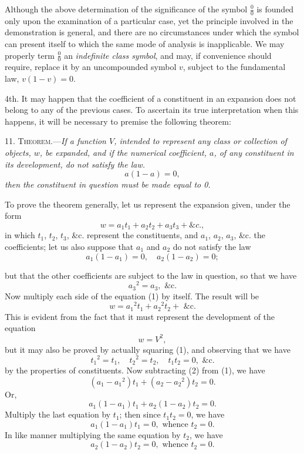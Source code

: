 \documentclass[oneside]{book}
\begin{document}
Although the above determination of the significance of the
symbol $\frac{0}{0}$ is founded only upon the examination of a particular
case, yet the principle involved in the demonstration is general,
and there are no circumstances under which the symbol can present
itself to which the same mode of analysis is inapplicable.
We may properly term $\frac{0}{0}$ an \textit{indefinite class symbol}, and may, if
convenience should require, replace it by an uncompounded symbol
$v$, subject to the fundamental law, $v (1 - v) = 0$.

4th. It may happen that the coefficient of a constituent in an
expansion does not belong to any of the previous cases. To ascertain
its true interpretation when this happens, it will be necessary
to premise the following theorem:

11. \textsc{Theorem.}---\textit{If a function $V$, intended to represent any
class or collection of objects, $w$, be expanded, and if the numerical
coefficient, $a$, of any constituent in its development, do not satisfy
the law.
\[
a\left(1-a\right) = 0,
\]
then the constituent in question must be made equal to 0.}

To prove the theorem generally, let us represent the expansion
given, under the form
\setcounter{equation}{0}
\begin{equation}
w = a_1 t_1 + a_2 t_2  + a_3 t_3 + \&c.,
\end{equation}
in which $t_1$, $t_2$, $t_3$, \&c. represent the constituents, and $a_1$, $a_2$, $a_3$, \&c.
the coefficients; let us also suppose that $a_1$ and $a_2$ do not satisfy
the law
\[
a_1 \left(1 - a_1\right) = 0, \quad a_2 \left(1 - a_2\right) = 0;
\]

but that the other coefficients are subject to the law in question,
so that we have
\[
{a_3}^2 = a_3, \textrm{ \&c.}
\]
Now multiply each side of the equation (1) by itself. The result
will be
\begin{equation}
w = {a_1}^2 t_1 + {a_2}^2 t_2 + \textrm{ \&c.}
\end{equation}
This is evident from the fact that it must represent the development
of the equation
\[
w = V^2,
\]
but it may also be proved by actually squaring (1), and observing
that we have
\[
{t_1}^2 = t_1, \quad {t_2}^2 = t_2, \quad t_1 t_2 = 0, \textrm{ \&c.}
\]
by the properties of constituents. Now subtracting (2) from (1),
we have
\[
\left(a_1 - {a_1}^2\right) t_1 + \left(a_2 - {a_2}^2\right) t_2 = 0.
\]
Or,
\[
a_1\left(1 - a_1\right) t_1 + a_2 \left(1 - a_2\right) t_2 = 0.
\]
Multiply the last equation by $t_1$; then since $t_1 t_2 = 0$, we have
\[
a_1 \left(1 - a_1\right) t_1 = 0,\textrm{ whence } t_2 = 0.
\]
In like manner multiplying the same equation by $t_2$, we have
\[
a_2 \left(1 - a_2\right) t_2 = 0,\textrm{ whence } t_2 = 0.
\]
\end{document}
